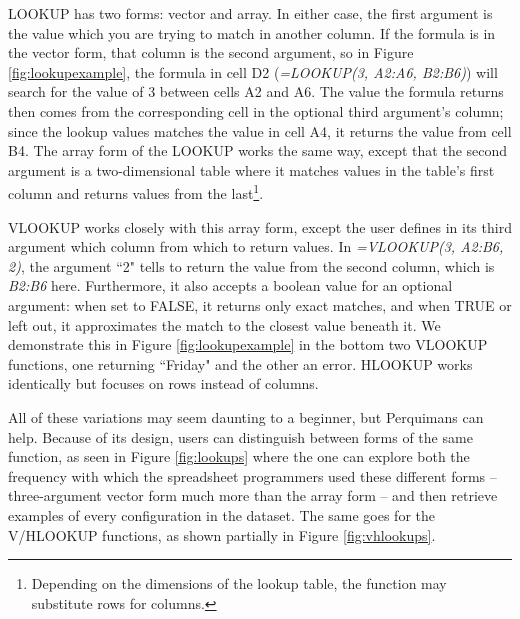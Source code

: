 \documentclass[conference]{IEEEtran}
\newcommand{\toolname}{Perquimans }
\begin{document}
	LOOKUP has two forms: vector and array. In either case, the first argument is
	the value which you are trying to match in another column. If the formula is in
	the vector form, that column is the second argument, so in Figure
	\ref{fig:lookupexample}, the formula in cell D2 (\textit{=LOOKUP(3, A2:A6,
		B2:B6)}) will search for the value of 3 between cells A2 and A6. The value the
	formula returns then comes from the corresponding cell in the optional third
	argument's column; since the lookup values matches the value in cell A4, it
	returns the value from cell B4. The array form of the LOOKUP works the same
	way, except that the second argument is a two-dimensional table where it
	matches values in the table's first column and returns values from the
	last\footnote{ Depending on the dimensions of the lookup table, the function
		may substitute rows for columns.}.
	
	VLOOKUP works closely with this array form, except the user defines in its
	third argument which column from which to return values. In \textit{=VLOOKUP(3,
		A2:B6, 2)}, the argument ``2" tells to return the value from the second column,
	which is \textit{B2:B6} here. Furthermore, it also accepts a boolean value for
	an optional argument: when set to FALSE, it returns only exact matches, and
	when TRUE or left out, it approximates the match to the closest value beneath
	it. We demonstrate this in Figure \ref{fig:lookupexample} in the bottom two
	VLOOKUP functions, one returning ``Friday" and the other an error. HLOOKUP
	works identically but focuses on rows instead of columns.
	
	All of these variations may seem daunting to a beginner, but \toolname can
	help. Because of its design, users can distinguish between forms of the same
	function, as seen in Figure \ref{fig:lookups} where the one can explore both
	the frequency with which the spreadsheet programmers used these different forms
	-- three-argument vector form much more than the array form -- and then
	retrieve examples of every configuration in the dataset. The same goes for the
	V/HLOOKUP functions, as shown partially in Figure \ref{fig:vhlookups}.
	
\end{document}
